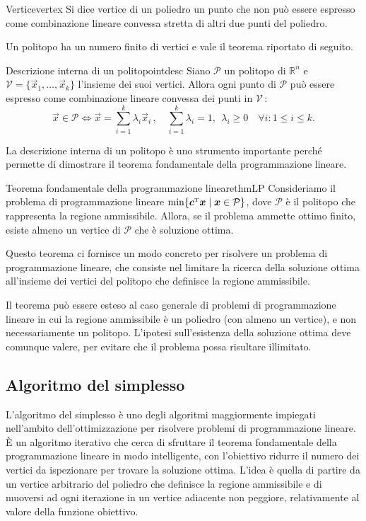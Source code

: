 \begin{definition}{Vertice}{vertex}
    Si dice vertice di un poliedro un punto che non può essere espresso come combinazione lineare convessa stretta di
    altri due punti del poliedro.
\end{definition}
\noindent
Un politopo ha un numero finito di vertici e vale il teorema riportato di seguito.
\begin{theorem}{Descrizione interna di un politopo}{intdesc}
    Siano \( \mathcal{P} \) un politopo di \( \mathbb{R}^n \) e \( \mathcal{V} = \{\vec{x}_1, \ldots, \vec{x}_k\} \)
    l'insieme dei suoi vertici. Allora ogni punto di \( \mathcal{P} \) può essere espresso come combinazione lineare
    convessa dei punti in \( \mathcal{V} \,\):
    \[
        \vec{x} \in \mathcal{P} \iff \vec{x} = \sum_{i=1}^k \lambda_i \vec{x}_i\,,\quad  \sum_{i=1}^k \lambda_i =
        1,\;\, \lambda_i \geq 0 \quad \forall i\colon 1 \leq i \leq k.
    \]
\end{theorem}
\noindent
La descrizione interna di un politopo è uno strumento importante perché permette di dimostrare il teorema fondamentale
della programmazione lineare.

\begin{theorem}{Teorema fondamentale della programmazione lineare}{thmLP}
    Consideriamo il problema di programmazione lineare \( \min\{\bm{c}^{\scriptscriptstyle\mathrm{T}}\bm{x} \mid \bm{x} \in \mathcal{P}\} \),
    dove \( \mathcal{P} \) è il politopo che rappresenta la regione ammissibile. Allora, se il problema ammette ottimo
    finito, esiste almeno un vertice di \( \mathcal{P} \) che è soluzione ottima.
\end{theorem}
\noindent
Questo teorema ci fornisce un modo concreto per risolvere un problema di programmazione lineare, che consiste nel limitare
la ricerca della soluzione ottima all'insieme dei vertici del politopo che definisce la regione ammissibile.

Il teorema può essere esteso al caso generale di problemi di programmazione lineare in cui la regione ammissibile è un
poliedro (con almeno un vertice), e non necessariamente un politopo. L'ipotesi sull'esistenza della soluzione ottima
deve comunque valere, per evitare che il problema possa risultare illimitato.

\subsection{Algoritmo del simplesso}
L'algoritmo del simplesso è uno degli algoritmi maggiormente impiegati nell'ambito dell'ottimizzazione per risolvere
problemi di programmazione lineare. \`E un algoritmo iterativo che cerca di sfruttare il teorema fondamentale della
programmazione lineare in modo intelligente, con l'obiettivo ridurre il numero dei vertici da ispezionare per trovare la
soluzione ottima. L'idea è quella di partire da un vertice arbitrario del poliedro che definisce la regione ammissibile
e di muoversi ad ogni iterazione in un vertice adiacente non peggiore, relativamente al valore della funzione obiettivo.

